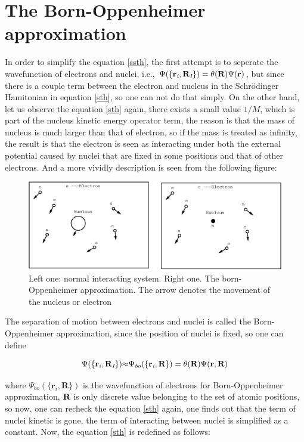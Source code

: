 \documentclass[a4paper, 12pt, titlepage,oneside,drop]{kthesis}
\begin{document}
\section{The Born-Oppenheimer approximation}
\label{ch:boa}
\noindent In order to simplify the equation  \ref{ssth}, the first attempt is to seperate the wavefunction of electrons and nuclei, i.e., 
$\Psi(\{ {\textbf r}_{\textit i}, {\textbf R}_{\textit I} \}) = {\theta(\textbf{R})} {\Psi(\textbf{r})} $, but since there is a couple term between the electron and nucleus in the Schrödinger Hamitonian in equation \ref{sth}, 
so one can not do that simply. On the other hand, let us observe the equation
\ref{sth} again, there exists a small value ${1}/{M}$, which is part of the nucleus kinetic energy
operator term, the reason is that the mass of nucleus is much larger than that of electron, so if the mass is treated
as infinity, the result is that the electron is seen as interacting under both the external potential caused by nuclei that are fixed in 
some positions and that of other electrons. And a more vividly description is seen from the following figure:
\begin{figure}[H]
\centering
\includegraphics[scale=.5]{system.eps}
\caption{Left one: normal interacting system. Right one. The born-Oppenheimer approximation. The arrow denotes the movement of the nucleus or electron}
\label{fig:bo}
\end{figure}

\noindent The separation of motion between electrons and nuclei is called the Born-Oppenheimer approximation, since the position of nuclei is fixed, so one can define

\begin{equation}\label{nwf}
{\Psi(\{ {\textbf r}_{\textit i}, {\textbf R}_{\textit I} \})}  {\approx}  {\Psi_{ \textit{bo}} ( \{ {\textbf{r}_{\textit{i}}},\textbf{R} \}) } = {\theta(\textbf{R})} {\Psi(\textbf{r}, \textbf{R})}
\end{equation}

 \noindent where $\Psi_{ \textit{bo}} ( \{ {\textbf{r}_{\textit{i}}},\textbf{R} \})$  is the wavefunction of electrons for Born-Oppenheimer approximation, $\textbf R$ is only discrete value belonging to the set of atomic positions, 
 so now, one can recheck the equation \ref{sth} again, one finds out that the term of nuclei kinetic is gone, the term of interacting
 between nuclei is simplified as a constant. Now, the equation \ref{sth} is redefined as follows:
\end{document}

